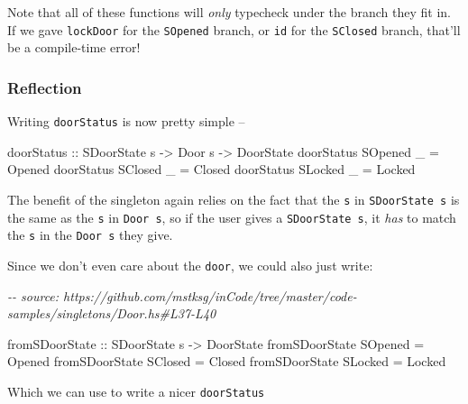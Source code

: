 \documentclass[]{article}
\newenvironment{Shaded}{}{}
\newcommand{\CommentTok}[1]{\textcolor[rgb]{0.38,0.63,0.69}{\textit{#1}}}
\newcommand{\DataTypeTok}[1]{\textcolor[rgb]{0.56,0.13,0.00}{#1}}
\newcommand{\NormalTok}[1]{#1}
\newcommand{\OtherTok}[1]{\textcolor[rgb]{0.00,0.44,0.13}{#1}}
\begin{document}
Note that all of these functions will \emph{only} typecheck under the branch
they fit in. If we gave \texttt{lockDoor} for the \texttt{SOpened} branch, or
\texttt{id} for the \texttt{SClosed} branch, that'll be a compile-time error!

\hypertarget{reflection}{%
\subsubsection{Reflection}\label{reflection}}

Writing \texttt{doorStatus} is now pretty simple --

\begin{Shaded}
\begin{Highlighting}[]
\OtherTok{doorStatus ::} \DataTypeTok{SDoorState}\NormalTok{ s }\OtherTok{{-}>} \DataTypeTok{Door}\NormalTok{ s }\OtherTok{{-}>} \DataTypeTok{DoorState}
\NormalTok{doorStatus }\DataTypeTok{SOpened}\NormalTok{ \_ }\OtherTok{=} \DataTypeTok{Opened}
\NormalTok{doorStatus }\DataTypeTok{SClosed}\NormalTok{ \_ }\OtherTok{=} \DataTypeTok{Closed}
\NormalTok{doorStatus }\DataTypeTok{SLocked}\NormalTok{ \_ }\OtherTok{=} \DataTypeTok{Locked}
\end{Highlighting}
\end{Shaded}

The benefit of the singleton again relies on the fact that the \texttt{s} in
\texttt{SDoorState\ s} is the same as the \texttt{s} in \texttt{Door\ s}, so if
the user gives a \texttt{SDoorState\ s}, it \emph{has} to match the \texttt{s}
in the \texttt{Door\ s} they give.

Since we don't even care about the \texttt{door}, we could also just write:

\begin{Shaded}
\begin{Highlighting}[]
\CommentTok{{-}{-} source: https://github.com/mstksg/inCode/tree/master/code{-}samples/singletons/Door.hs\#L37{-}L40}

\OtherTok{fromSDoorState ::} \DataTypeTok{SDoorState}\NormalTok{ s }\OtherTok{{-}>} \DataTypeTok{DoorState}
\NormalTok{fromSDoorState }\DataTypeTok{SOpened} \OtherTok{=} \DataTypeTok{Opened}
\NormalTok{fromSDoorState }\DataTypeTok{SClosed} \OtherTok{=} \DataTypeTok{Closed}
\NormalTok{fromSDoorState }\DataTypeTok{SLocked} \OtherTok{=} \DataTypeTok{Locked}
\end{Highlighting}
\end{Shaded}

Which we can use to write a nicer \texttt{doorStatus}
\end{document}
